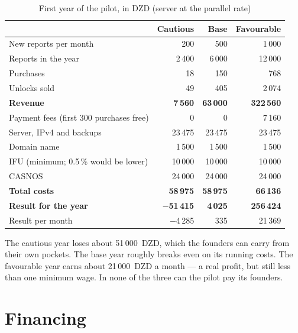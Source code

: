 \begin{table}[htbp]
\centering
\caption{First year of the pilot, in DZD (server at the parallel rate)}
\label{tab:year1}
\small
\begin{tabularx}{\textwidth}{@{}X r r r@{}}
\toprule
 & \textbf{Cautious} & \textbf{Base} & \textbf{Favourable} \\
\midrule
New reports per month                      & 200       & 500      & 1\,000 \\
Reports in the year                        & 2\,400    & 6\,000   & 12\,000 \\
Purchases                                  & 18        & 150      & 768 \\
Unlocks sold                               & 49        & 405      & 2\,074 \\
\midrule
\textbf{Revenue}                           & \textbf{7\,560} & \textbf{63\,000} & \textbf{322\,560} \\
\midrule
Payment fees (first 300 purchases free)    & 0         & 0        & 7\,160 \\
Server, IPv4 and backups                   & 23\,475   & 23\,475  & 23\,475 \\
Domain name                                & 1\,500    & 1\,500   & 1\,500 \\
IFU (minimum; 0.5\,\% would be lower)      & 10\,000   & 10\,000  & 10\,000 \\
CASNOS                                     & 24\,000   & 24\,000  & 24\,000 \\
\textbf{Total costs}                       & \textbf{58\,975} & \textbf{58\,975} & \textbf{66\,136} \\
\midrule
\textbf{Result for the year}               & \textbf{$-$51\,415} & \textbf{4\,025} & \textbf{256\,424} \\
Result per month                           & $-$4\,285 & 335      & 21\,369 \\
\bottomrule
\end{tabularx}
\end{table}

The cautious year loses about 51\,000~DZD, which the founders can carry from
their own pockets. The base year roughly breaks even on its running costs. The
favourable year earns about 21\,000~DZD a month --- a real profit, but still less
than one minimum wage. In none of the three can the pilot pay its founders.

\section{Financing}

